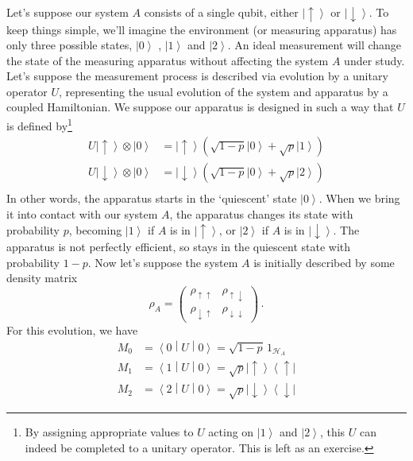 \documentclass{article}
\theoremstyle{plain}\theoremheaderfont{\normalfont\itshape}\theorembodyfont{\rmfamily}\theoremseparator{.}\newtheorem*{rem}{Remark}\newtheorem*{ex}{Example}\newtheorem*{proof}{Proof}\newtheorem*{altp}{Alternative proof}
\theoremstyle{plain}\theoremheaderfont{\normalfont\bfseries}\theorembodyfont{\rmfamily}\theoremseparator{.}\newtheorem{thm}{Theorem}[section]\newtheorem{lem}[thm]{Lemma}\newtheorem{prop}[thm]{Proposition}\newtheorem*{cor}{Corollary}\newtheorem{defn}[thm]{Definition}\newtheorem{clm}[thm]{Claim}\newtheorem{clminproof}{Claim}
\theoremstyle{break}\theoremheaderfont{\normalfont\itshape}\theorembodyfont{\rmfamily}\theoremseparator{.\medskip}\newtheorem*{proofskip}{Proof}\newtheorem*{exs}{Examples}\newtheorem*{rems}{Remarks}
\theoremstyle{break}\theoremheaderfont{\normalfont\bfseries}\theorembodyfont{\rmfamily}\theoremseparator{.\medskip}\newtheorem{lemskip}[thm]{Lemma}\newtheorem{defnskip}[thm]{Definition}\newtheorem{propskip}[thm]{Proposition}\newtheorem{thmskip}[thm]{Theorem}
\numberwithin{equation}{section}
\newcommand{\bra}[1]{\left\langle #1 \right|}
\newcommand{\ket}[1]{\left| #1 \right\rangle}
\newcommand{\mel}[3]{\left\langle #1 \middle| #2 \middle| #3 \right\rangle}
\newcommand{\hb}{\mathcal{H}}
\begin{document}
    Let's suppose our system \(A\) consists of a single qubit, either \(\ket{\uparrow}\) or \(\ket{\downarrow}\). To keep things simple, we'll imagine the environment (or measuring apparatus) has only three possible states, \(\ket{0}\) , \(\ket{1}\) and \(\ket{2}\). An ideal measurement will change the state of the measuring apparatus without affecting the system \(A\) under study. Let's suppose the measurement process is described via evolution by a unitary operator \(U\), representing the usual evolution of the system and apparatus by a coupled Hamiltonian. We suppose our apparatus is
    designed in such a way that \(U\) is defined by\footnote{By assigning appropriate values to \(U\) acting on \(\ket{1}\) and \(\ket{2}\), this \(U\) can indeed be completed to a unitary operator. This is left as an exercise.}
    \begin{equation}\label{measurement_apparatus_U}
        \begin{aligned}
            U\ket{\uparrow}\otimes\ket{0}&=\ket{\uparrow}(\sqrt{1-p}\ket{0}+\sqrt{p}\ket{1})\\
            U\ket{\downarrow}\otimes\ket{0}&=\ket{\downarrow}(\sqrt{1-p}\ket{0}+\sqrt{p}\ket{2})\\
        \end{aligned}
    \end{equation}
    In other words, the apparatus starts in the `quiescent' state \(\ket{0}\). When we bring it into contact with our system \(A\), the apparatus changes its state with probability \(p\), becoming \(\ket{1}\) if \(A\) is in \(\ket{\uparrow}\), or \(\ket{2}\) if \(A\) is in \(\ket{\downarrow}\). The apparatus is not perfectly efficient, so stays in the quiescent state with probability \(1-p\). Now let's suppose the system \(A\) is initially described by some density matrix
    \begin{equation}
        \rho_{A}=\begin{pmatrix}
            \rho_{\uparrow\uparrow} & \rho_{\uparrow\downarrow}\\
            \rho_{\downarrow\uparrow} & \rho_{\downarrow\downarrow}
        \end{pmatrix}\,.
    \end{equation}
    For this evolution, we have
    \begin{equation}
        \begin{aligned}
            M_0&=\mel{0}{U}{0}=\sqrt{1-p}\, 1_{\hb_A}\\
            M_1&=\mel{1}{U}{0}=\sqrt{p}\ket{\uparrow}\bra{\uparrow}\\
            M_2&=\mel{2}{U}{0}=\sqrt{p}\ket{\downarrow}\bra{\downarrow}
        \end{aligned}
    \end{equation}
\end{document}
